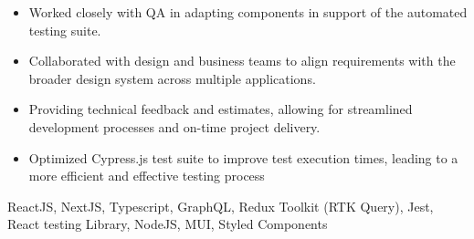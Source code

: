 \begin{projects}
{\begin{itemize}
        \item Worked closely with QA in adapting components in support of the automated testing suite.
        \item Collaborated with design and business teams to align requirements with the broader design system across multiple applications.
        \item Providing technical feedback and estimates, allowing for streamlined development processes and on-time project delivery.
        \item Optimized Cypress.js test suite to improve test execution times, leading to a more efficient and effective testing process
    \end{itemize}}
    {ReactJS, NextJS, Typescript, GraphQL, Redux Toolkit (RTK Query), Jest, React testing Library, NodeJS, MUI, Styled Components}


\end{projects}
